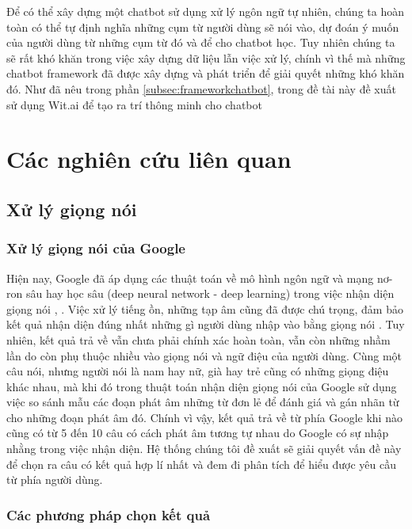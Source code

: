 \documentclass[12pt]{report}
\begin{document}
Để có thể xây dựng một chatbot sử dụng xử lý ngôn ngữ tự nhiên, chúng ta hoàn toàn có thể tự định nghĩa những cụm từ người dùng sẽ nói vào, dự đoán ý muốn của người dùng từ những cụm từ đó và để cho chatbot học. Tuy nhiên chúng ta sẽ rất khó khăn trong việc xây dựng dữ liệu lẫn việc xử lý, chính vì thế mà những chatbot framework đã được xây dựng và phát triển để giải quyết những khó khăn đó. Như đã nêu trong phần \ref{subsec:frameworkchatbot}, trong đề tài này đề xuất sử dụng Wit.ai để tạo ra trí thông minh cho chatbot

\chapter{Các nghiên cứu liên quan}

\section{Xử lý giọng nói}

\subsection{Xử lý giọng nói của Google}

Hiện nay, Google đã áp dụng các thuật toán về mô hình ngôn ngữ và mạng nơ-ron sâu hay học sâu (deep neural network - deep learning) trong việc nhận diện giọng nói \cite{robustasr}, \cite{bayesLMformobile}. Việc xử lý tiếng ồn, những tạp âm cũng đã được chú trọng, đảm bảo kết quả nhận diện đúng nhất những gì người dùng nhập vào bằng giọng nói \cite{robustasr}. Tuy nhiên, kết quả trả về vẫn chưa phải chính xác hoàn toàn, vẫn còn những nhầm lần do còn phụ thuộc nhiều vào giọng nói và ngữ điệu của người dùng. Cùng một câu nói, nhưng người nói là nam hay nữ, già hay trẻ cũng có những giọng điệu khác nhau, mà khi đó trong thuật toán nhận diện giọng nói của Google sử dụng việc so sánh mẫu các đoạn phát âm những từ đơn lẻ để đánh giá và gán nhãn từ cho những đoạn phát âm đó. Chính vì vậy, kết quả trả về từ phía Google khi nào cũng có từ 5 đến 10 câu có cách phát âm tương tự nhau do Google có sự nhập nhằng trong việc nhận diện. Hệ thống chúng tôi đề xuất sẽ giải quyết vấn đề này để chọn ra câu có kết quả hợp lí nhất và đem đi phân tích để hiểu được yêu cầu từ phía người dùng.

\subsection{Các phương pháp chọn kết quả}
\end{document}
